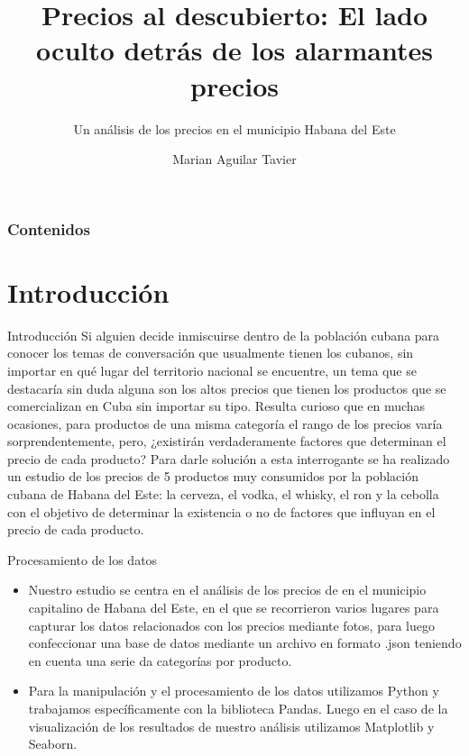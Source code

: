 \documentclass{beamer}
\title{Precios al descubierto: El lado oculto detrás de los alarmantes precios}
\subtitle{Un análisis de los precios en el municipio Habana del Este}
\author{Marian Aguilar Tavier}
\institute{Universidad de La Habana}
\date[\textcolor{white}{Julio, 2023}]
\begin{document}
\frame{\titlepage}
\begin{frame}
\frametitle{Contenidos}
\tableofcontents
\end{frame}
\section{Introducción}
    \begin{frame}{Introducción}
 Si alguien decide inmiscuirse dentro de la población cubana para conocer los temas de conversación que usualmente tienen los cubanos, sin importar en qué lugar del territorio nacional se encuentre,  un tema que se destacaría sin duda alguna son los altos precios que tienen los productos que se comercializan en Cuba sin importar su tipo.  Resulta curioso que en muchas ocasiones, para productos de una misma categoría el rango de los precios varía sorprendentemente, pero, ¿existirán verdaderamente factores que determinan el precio de cada producto?
Para darle solución a esta interrogante se ha realizado un estudio de los precios de 5 productos muy consumidos por la población cubana de Habana del Este: la cerveza, el vodka, el whisky, el ron y la cebolla con el objetivo de determinar la existencia o no de factores que influyan en el precio de cada producto.  

    \end{frame}

    \begin{frame}{Procesamiento de los datos}
        \begin{itemize}
            \item Nuestro estudio se centra en el análisis de los precios de en el municipio capitalino de Habana del Este, en el que se recorrieron varios lugares para capturar los datos relacionados con los precios mediante fotos, para luego confeccionar una base de datos mediante un archivo en formato .json teniendo en cuenta una serie da categorías por producto.
            \item Para la manipulación y el procesamiento de los datos utilizamos Python y trabajamos específicamente con la biblioteca Pandas. Luego en el caso de la visualización de los resultados de nuestro análisis utilizamos Matplotlib y Seaborn.
        \end{itemize}
    \end{frame}
\end{document}
